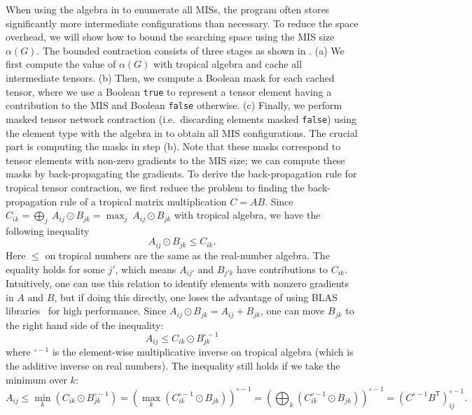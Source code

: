 \documentclass[review, onefignum, onetabnum]{siamart190516}
\begin{document}
When using the algebra in  to enumerate all MISs, the program often stores significantly more intermediate configurations than necessary.
To reduce the space overhead, we will show how to bound the searching space using the MIS size $\alpha(G)$.
The bounded contraction consists of three stages as shown in . (a) We first compute the value of $\alpha(G)$ with tropical algebra and cache all intermediate tensors.
(b) Then, we compute a Boolean mask for each cached tensor, where we use a Boolean \texttt{true} to represent a tensor element having a contribution to the MIS and Boolean \texttt{false} otherwise.
(c) Finally, we perform masked tensor network contraction (i.e.\ discarding elements masked \texttt{false}) using the element type with the algebra in  to obtain all MIS configurations.
The crucial part is computing the masks in step (b). Note that these masks correspond to tensor elements with non-zero gradients to the MIS size; we can compute these masks by back-propagating the gradients.
To derive the back-propagation rule for tropical tensor contraction,
we first reduce the problem to finding the back-propagation rule of a tropical matrix multiplication $C = A B$.
Since $ C_{ik} = \bigoplus_{j} \ A_{ij} \odot B_{jk} = \max_{j} \ A_{ij} \odot B_{jk}$ with tropical algebra, we have the following inequality
\begin{equation}
    A_{ij} \odot B_{jk} \leq C_{ik}.
\end{equation}
Here $\leq$ on tropical numbers are the same as the real-number algebra.
The equality holds for some $j'$, which means $A_{ij'}$ and $B_{j'k}$ have contributions to $C_{ik}$.
Intuitively, one can use this relation to identify elements with nonzero gradients in $A$ and $B$,
but if doing this directly, one loses the advantage of using BLAS libraries~\cite{TropicalGEMM} for high performance.
Since $A_{ij} \odot B_{jk} = A_{ij} + B_{jk}$, one can move $B_{jk}$ to the right hand side of the inequality: 
\begin{equation}
    A_{ij} \leq C_{ik} \odot B_{jk}^{\circ -1}
\end{equation}
where ${}^{\circ -1}$ is the element-wise multiplicative inverse on tropical algebra (which is the additive inverse on real numbers).
The inequality still holds if we take the minimum over $k$: 
\begin{equation}
    A_{ij} \leq \min_{k}(C_{ik} \odot B_{jk}^{\circ -1}) = \left(\max_{k} \left(C_{ik}^{\circ -1} \odot B_{jk} \right) \right)^{\circ -1} = \left(\bigoplus_{k} \left(C_{ik}^{\circ -1} \odot B_{jk} \right) \right)^{\circ -1} = \left( C^{\circ-1} B^{\mathsf{T}} \right)^{\circ -1}_{ij}.
\end{equation}
\end{document}
